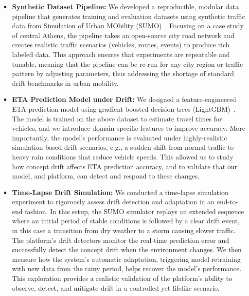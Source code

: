 \begin{itemize}
    \item \textbf{Synthetic Dataset Pipeline:} We developed a reproducible, modular data pipeline that generates training and evaluation datasets using synthetic traffic data from Simulation of Urban MObility (SUMO)~\cite{krajzewicz2012recent}.
        Focusing on a case study of central Athens, the pipeline takes an open-source city road network and creates realistic traffic scenarios (vehicles, routes, events) to produce rich labeled data.
        This approach ensures that experiments are repeatable and tunable, meaning that the pipeline can be re-run for any city region or traffic pattern by adjusting parameters, thus addressing the shortage of standard drift benchmarks in urban mobility.

    \item \textbf{ETA Prediction Model under Drift:} We designed a feature-engineered ETA prediction model using gradient-boosted decision trees (LightGBM)~\cite{ke2017lightgbm}.
        The model is trained on the above dataset to estimate travel times for vehicles, and we introduce domain-specific features to improve accuracy.
        More importantly, the model's performance is evaluated under highly-realistic simulation-based drift scenarios, e.g., a sudden shift from normal traffic to heavy rain conditions that reduce vehicle speeds.
        This allowed us to study how concept drift affects ETA prediction accuracy, and to validate that our model, and platform, can detect and respond to these changes.

    \item \textbf{Time-Lapse Drift Simulation:} We conducted a time-lapse simulation experiment to rigorously assess drift detection and adaptation in an end-to-end fashion.
        In this setup, the SUMO simulator replays an extended sequence where an initial period of stable conditions is followed by a clear drift event, in this case a transition from dry weather to a storm causing slower traffic.
        The platform's drift detectors monitor the real-time prediction error and successfully detect the concept drift when the environment changes.
        We then measure how the system's automatic adaptation, triggering model retraining with new data from the rainy period, helps recover the model's performance.
        This exploration provides a realistic validation of the platform's ability to observe, detect, and mitigate drift in a controlled yet lifelike scenario.


\end{itemize}
